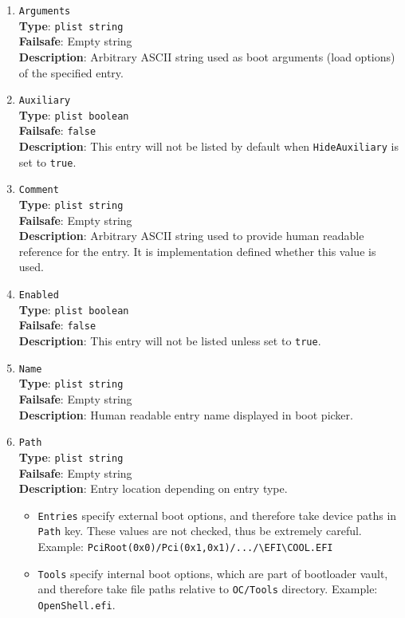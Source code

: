 \documentclass[]{article}
\providecommand{\tightlist}{%
  \setlength{\itemsep}{0pt}\setlength{\parskip}{0pt}}
\begin{document}
\begin{enumerate}
\item
  \texttt{Arguments}\\
  \textbf{Type}: \texttt{plist\ string}\\
  \textbf{Failsafe}: Empty string\\
  \textbf{Description}: Arbitrary ASCII string used as boot arguments (load options)
  of the specified entry.

\item
  \texttt{Auxiliary}\\
  \textbf{Type}: \texttt{plist\ boolean}\\
  \textbf{Failsafe}: \texttt{false}\\
  \textbf{Description}: This entry will not be listed by default when
  \texttt{HideAuxiliary} is set to \texttt{true}.

\item
  \texttt{Comment}\\
  \textbf{Type}: \texttt{plist\ string}\\
  \textbf{Failsafe}: Empty string\\
  \textbf{Description}: Arbitrary ASCII string used to provide human readable
  reference for the entry. It is implementation defined whether this value is
  used.

\item
  \texttt{Enabled}\\
  \textbf{Type}: \texttt{plist\ boolean}\\
  \textbf{Failsafe}: \texttt{false}\\
  \textbf{Description}: This entry will not be listed unless set to
  \texttt{true}.

\item
  \texttt{Name}\\
  \textbf{Type}: \texttt{plist\ string}\\
  \textbf{Failsafe}: Empty string\\
  \textbf{Description}: Human readable entry name displayed in boot picker.

\item
  \texttt{Path}\\
  \textbf{Type}: \texttt{plist\ string}\\
  \textbf{Failsafe}: Empty string\\
  \textbf{Description}: Entry location depending on entry type.

  \begin{itemize}
  \tightlist
  \item \texttt{Entries} specify external boot options, and therefore take device
  paths in \texttt{Path} key. These values are not checked, thus be extremely careful.
  Example: \texttt{PciRoot(0x0)/Pci(0x1,0x1)/.../\textbackslash EFI\textbackslash COOL.EFI}
  \item \texttt{Tools} specify internal boot options, which are part of bootloader
  vault, and therefore take file paths relative to \texttt{OC/Tools} directory.
  Example: \texttt{OpenShell.efi}.
  \end{itemize}

\end{enumerate}
\end{document}
